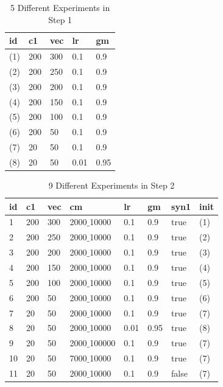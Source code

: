 \begin{table}[H]

\begin{center}
\begin{tabular}{|l|l|l|l|l|}
\hline
id&c1&vec&lr&gm \\ \hline
(1) 	&  200 		& 300  	& 0.1		& 0.9	\\ \hline
(2) 	&  200 		& 250  	& 0.1		& 0.9	\\ \hline
(3) 	&  200 		& 200  	& 0.1		& 0.9	\\ \hline
(4) 	&  200 		& 150  	& 0.1		& 0.9	\\ \hline
(5) 	&  200 		& 100  	& 0.1		& 0.9	\\ \hline
(6) 	&  200 		& 50 	& 0.1		& 0.9	\\ \hline
(7)	&  20		& 50	& 0.1		& 0.9	\\ \hline
(8)	&  20		& 50	& 0.01		& 0.95	\\ \hline
\end{tabular}

\caption{5 Different Experiments in Step 1} \label{tab:experiment4}
\end{center}
\end{table}


\begin{table}[H]

\begin{center}
\begin{tabular}{|l|l|l|l|l|l|l|l|}
\hline
id&c1&vec&cm&lr&gm&syn1&init \\ \hline
1 	&  200 		& 300 	& 2000$\_$10000 	& 0.1		& 0.9	& true & (1)\\ \hline
2	&  200		& 250   & 2000$\_$10000 	& 0.1		& 0.9	& true & (2)\\ \hline
3	&  200		& 200   & 2000$\_$10000 	& 0.1		& 0.9	& true & (3)\\ \hline
4	&  200		& 150   & 2000$\_$10000 	& 0.1		& 0.9	& true & (4)\\ \hline
5 	&  200 		& 100 	& 2000$\_$10000 	& 0.1		& 0.9	& true & (5) \\ \hline
6 	&  200 		& 50 	& 2000$\_$10000 	& 0.1		& 0.9	& true & (6)\\ \hline
7	&  20		& 50	& 2000$\_$10000	& 0.1		& 0.9	& true & (7)\\ \hline
8	&  20		& 50	& 2000$\_$10000	& 0.01		& 0.95	& true & (8)\\ \hline
9 	&  20		& 50 	& 2000$\_$100000 	& 0.1		& 0.9	& true & (7)\\ \hline
10 	&  20		& 50 	& 7000$\_$10000 	& 0.1		& 0.9	& true & (7)\\ \hline
11 	&  20		& 50 	& 2000$\_$10000 	& 0.1		& 0.9	& false& (7)\\ \hline
\end{tabular}

\caption{9 Different Experiments in Step 2} \label{tab:experiment9}
\end{center}
\end{table}

